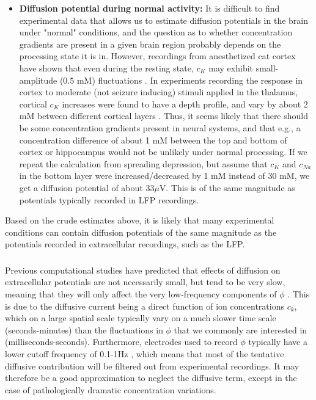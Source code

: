 \begin{itemize}
\item{\bf Diffusion potential during normal activity:} It is difficult to find experimental data that allows us to estimate diffusion potentials in the brain under "normal" conditions, and the question as to whether concentration gradients are present in a given brain region probably depends on the processing state it is in. However, recordings from anesthetized cat cortex have shown that even during the resting state, $c_K$ may exhibit small-amplitude (0.5 mM) fluctuations \cite{MCCREERY1983}. In experiments recording the response in cortex to moderate (not seizure inducing) stimuli applied in the thalamus, cortical $c_K$ increases were found to have a depth profile, and vary by about 2 mM between different cortical layers \cite{Cordingley1978}. Thus, it seems likely that there should be some concentration gradients present in neural systems, and that e.g., a concentration difference of about 1 mM between the top and bottom of cortex or hippocampus would not be unlikely under normal processing. If we repeat the calculation from spreading depression, but assume that $c_{K}$ and $c_{Na}$ in the bottom layer were increased/decreased by 1 mM instead of 30 mM, we get a diffusion potential of about $33 \mu$V. This is of the same magnitude as potentials typically recorded in LFP recordings. 

\end{itemize}

Based on the crude estimates above, it is likely that many experimental conditions can contain diffusion potentials of the same magnitude as the potentials recorded in extracellular recordings, such as the LFP. 


\subsubsection{}

Previous computational studies have predicted that effects of diffusion on extracellular potentials are not necessarily small, but tend to be very slow, meaning that they will only affect the very low-frequency components of $\phi$ \citep{Halnes2016, Halnes2017}. This is due to the diffusive current being a direct function of ion concentrations $c_k$, which on a large spatial scale typically vary on a much slower time scale (seconds-minutes) than the fluctuations in $\phi$ that we commonly are interested in (milliseconds-seconds). Furthermore, electrodes used to record $\phi$ typically have a lower cutoff frequency of 0.1-1Hz \citep{Einevoll2013}, which means that most of the tentative diffusive contribution will be filtered out from experimental recordings. It may therefore be a good approximation to neglect the diffusive term, except in the case of pathologically dramatic concentration variations.
